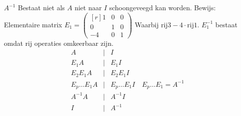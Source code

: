 $A^{-1}$ Bestaat niet als $A$ niet naar $I$ schoongeveegd kan worden. Bewijs: Elementaire matrix $E_1 = \begin{pmatrix*}[r] 1 & 0 & 0 \\
0 & 1 & 0 \\
-4 & 0 & 1 \end{pmatrix*}$ Waarbij $\mbox{rij} 3 - 4 \cdot \mbox{rij} 1$. $E_1^{-1}$ bestaat omdat rij operaties omkeerbaar zijn.
\begin{eqnarray*}
	A &|& I \\
	E_1A &|& E_1I \\
	E_2E_1A &|& E_2E_1I \\
	E_p \ldots E_1A &|& E_p \ldots E_1I \quad E_p \ldots E_1 = A^{-1} \\
	A^{-1}A &|& A^{-1}I \\
	I &|& A^{-1}
\end{eqnarray*}